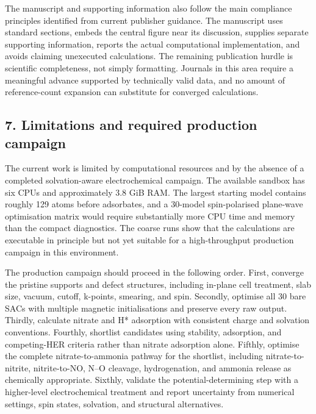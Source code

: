 \documentclass[
]{article}
\begin{document}
The manuscript and supporting information also follow the main
compliance principles identified from current publisher guidance. The
manuscript uses standard sections, embeds the central figure near its
discussion, supplies separate supporting information, reports the actual
computational implementation, and avoids claiming unexecuted
calculations. The remaining publication hurdle is scientific
completeness, not simply formatting. Journals in this area require a
meaningful advance supported by technically valid data, and no amount of
reference-count expansion can substitute for converged calculations.

\hypertarget{limitations-and-required-production-campaign}{%
\subsection{7. Limitations and required production
campaign}\label{limitations-and-required-production-campaign}}

The current work is limited by computational resources and by the
absence of a completed solvation-aware electrochemical campaign. The
available sandbox has six CPUs and approximately 3.8 GiB RAM. The
largest starting model contains roughly 129 atoms before adsorbates, and
a 30-model spin-polarised plane-wave optimisation matrix would require
substantially more CPU time and memory than the compact diagnostics. The
coarse runs show that the calculations are executable in principle but
not yet suitable for a high-throughput production campaign in this
environment.

The production campaign should proceed in the following order. First,
converge the pristine supports and defect structures, including in-plane
cell treatment, slab size, vacuum, cutoff, k-points, smearing, and spin.
Secondly, optimise all 30 bare SACs with multiple magnetic
initialisations and preserve every raw output. Thirdly, calculate
nitrate and H* adsorption with consistent charge and solvation
conventions. Fourthly, shortlist candidates using stability, adsorption,
and competing-HER criteria rather than nitrate adsorption alone.
Fifthly, optimise the complete nitrate-to-ammonia pathway for the
shortlist, including nitrate-to-nitrite, nitrite-to-NO, N--O cleavage,
hydrogenation, and ammonia release as chemically appropriate. Sixthly,
validate the potential-determining step with a higher-level
electrochemical treatment and report uncertainty from numerical
settings, spin states, solvation, and structural alternatives.
\end{document}
